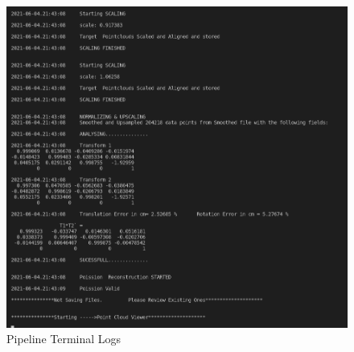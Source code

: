 \documentclass[12pt]{report}
\begin{document}
\begin{figure}[H]%
  \centering
  \includegraphics[width=1\textwidth]{log3.png}
\caption{Pipeline Terminal Logs}
\label{fig:log3}
\end{figure}

\end{document}
